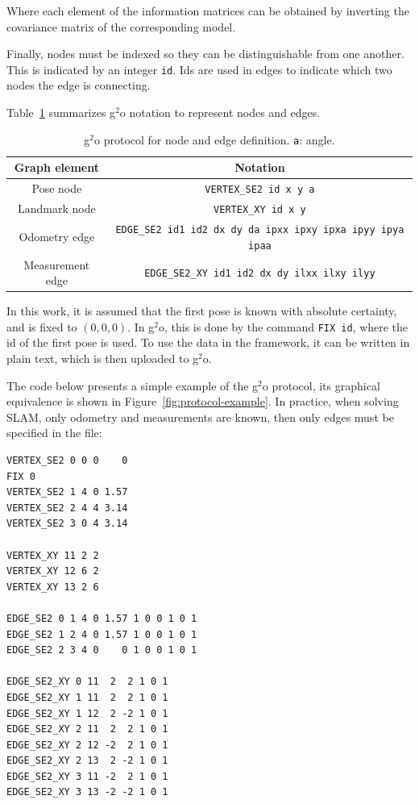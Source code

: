 Where each element of the information matrices can be obtained by inverting the covariance matrix of the corresponding model. 

Finally, nodes must be indexed so they can be distinguishable from one another. This is indicated by an integer \texttt{id}. Ids are used in edges to indicate which two nodes the edge is connecting.

Table~\ref{tab:protocol} summarizes g$^2$o notation to represent nodes and edges.

\begin{table}[htbp!]
    \centering
    \begin{tabular}{|c|c|}
        \hline
        Graph element & Notation\\
        \hline
        Pose node & \texttt{VERTEX\_SE2 id x y a}\\
        Landmark node & \texttt{VERTEX\_XY id x y}\\
        Odometry edge & \texttt{EDGE\_SE2 id1 id2 dx dy da ipxx ipxy ipxa ipyy ipya ipaa}\\
        Measurement edge & \texttt{EDGE\_SE2\_XY id1 id2 dx dy ilxx ilxy ilyy}\\
        \hline
    \end{tabular}
    \caption{g$^2$o protocol for node and edge definition. \texttt{a}: angle.}
    \label{tab:protocol}
\end{table}

In this work, it is assumed that the first pose is known with absolute certainty, and is fixed to $(0,0,0)$. In g$^2$o, this is done by the command \texttt{FIX id}, where the id of the first pose is used. To use the data in the framework, it can be written in plain text, which is then uploaded to g$^2$o.

The code below presents a simple example of the g$^2$o protocol, its graphical equivalence is shown in Figure~\ref{fig:protocol-example}. In practice, when solving SLAM, only odometry and measurements are known, then only edges must be specified in the file:
 
\begin{lstlisting}[caption = g$^2$o protocol example, captionpos=b, basicstyle=\small]
VERTEX_SE2 0 0 0    0
FIX 0
VERTEX_SE2 1 4 0 1.57
VERTEX_SE2 2 4 4 3.14
VERTEX_SE2 3 0 4 3.14

VERTEX_XY 11 2 2
VERTEX_XY 12 6 2
VERTEX_XY 13 2 6

EDGE_SE2 0 1 4 0 1.57 1 0 0 1 0 1
EDGE_SE2 1 2 4 0 1.57 1 0 0 1 0 1
EDGE_SE2 2 3 4 0    0 1 0 0 1 0 1

EDGE_SE2_XY 0 11  2  2 1 0 1
EDGE_SE2_XY 1 11  2  2 1 0 1
EDGE_SE2_XY 1 12  2 -2 1 0 1
EDGE_SE2_XY 2 11  2  2 1 0 1
EDGE_SE2_XY 2 12 -2  2 1 0 1
EDGE_SE2_XY 2 13  2 -2 1 0 1
EDGE_SE2_XY 3 11 -2  2 1 0 1
EDGE_SE2_XY 3 13 -2 -2 1 0 1
\end{lstlisting}

